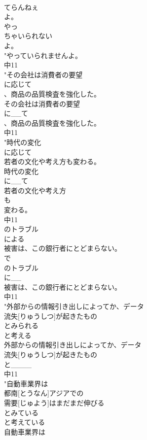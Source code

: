 \documentclass[8pt]{extreport}
\begin{document}
\begin{CJK}{UTF8}{min}
\\	てらんねぇ
\\	よ。
\\	やっ
\\	ちゃいられない
\\	よ。
\\	"やっていられませんよ。
\\	中11
\\	"その会社は消費者の要望
\\	に応じて
\\	、商品の品質検査を強化した。
\\	その会社は消費者の要望
\\	に__て
\\	、商品の品質検査を強化した。
\\	中11
\\	"時代の変化
\\	に応じて
\\	若者の文化や考え方も変わる。
\\	時代の変化
\\	に__て
\\	若者の文化や考え方
\\	も
\\	変わる。
\\	中11
\\	のトラブル
\\	による
\\	被害は、この銀行者にとどまらない。
\\	で	
\\	のトラブル
\\	に__
\\	被害は、この銀行者にとどまらない。
\\	中11
\\	"外部からの情報引き出しによってか、データ
\\	流失[りゅうしつ]が起きたもの
\\	とみられる
\\	と考える 
\\	外部からの情報引き出しによってか、データ
\\	流失[りゅうしつ]が起きたもの
\\	と____
\\	中11
\\	"自動車業界は
\\	都南[とうなん]アジアでの
\\	需要[じゅよう]はまだまだ伸びる
\\	とみている
\\	と考えている 
\\	自動車業界は

\end{CJK}
\end{document}
